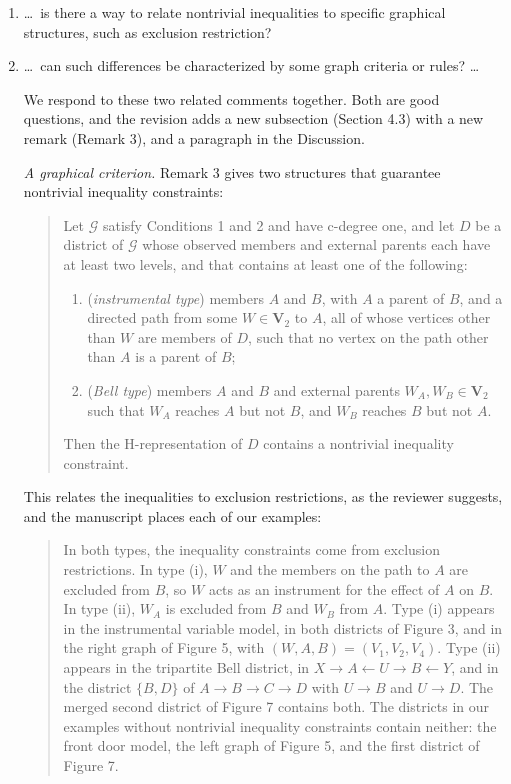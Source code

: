 \documentclass{article}
\newcommand{\bV}{\boldsymbol{V}}
\begin{document}
\begin{enumerate}

    \item[1.] \ldots\, is there a way to relate nontrivial inequalities to specific graphical structures, such as exclusion restriction?

    \item[3.] \ldots\, can such differences be characterized by some graph criteria or rules? \ldots


    \begin{mdframed}
    We respond to these two related comments together. Both are good questions, and the revision adds a new subsection (Section 4.3) with a new remark (Remark 3), and a paragraph in the Discussion.


\emph{A graphical criterion.} Remark 3 gives two structures that guarantee nontrivial inequality constraints:
\begin{quote}
Let $\mathcal{G}$ satisfy Conditions 1 and 2 and have c-degree one, and let $D$ be a district of $\mathcal{G}$ whose observed members and external parents each have at least two levels, and that contains at least one of the following:
\begin{enumerate}
\item[(i)] (\emph{instrumental type}) members $A$ and $B$, with $A$ a parent of $B$, and a directed path from some $W \in \bV_2$ to $A$, all of whose vertices other than $W$ are members of $D$, such that no vertex on the path other than $A$ is a parent of $B$;
\item[(ii)] (\emph{Bell type}) members $A$ and $B$ and external parents $W_A, W_B \in \bV_2$ such that $W_A$ reaches $A$ but not $B$, and $W_B$ reaches $B$ but not $A$.
\end{enumerate}
Then the H-representation of $D$ contains a nontrivial inequality constraint.
\end{quote}
This relates the inequalities to exclusion restrictions, as the reviewer suggests, and the manuscript places each of our examples:
\begin{quote}
In both types, the inequality constraints come from exclusion restrictions. In type (i), $W$ and the members on the path to $A$ are excluded from $B$, so $W$ acts as an instrument for the effect of $A$ on $B$. In type (ii), $W_A$ is excluded from $B$ and $W_B$ from $A$. Type (i) appears in the instrumental variable model, in both districts of Figure 3, and in the right graph of Figure 5, with $(W, A, B) = (V_1, V_2, V_4)$. Type (ii) appears in the tripartite Bell district, in $X \rightarrow A \leftarrow U \rightarrow B \leftarrow Y$, and in the district $\{B, D\}$ of $A \rightarrow B \rightarrow C \rightarrow D$ with $U \rightarrow B$ and $U \rightarrow D$. The merged second district of Figure 7 contains both. The districts in our examples without nontrivial inequality constraints contain neither: the front door model, the left graph of Figure 5, and the first district of Figure 7.
\end{quote}


\end{mdframed}
\end{enumerate}
\end{document}
